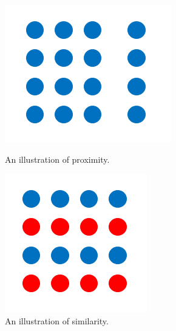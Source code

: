 			\begin{figure}
  					\includegraphics[width=\linewidth]{resources/images/proximity.png}
  					\caption{An illustration of proximity.}\label{fig:proximity}
  				\endminipage\hfill
  					\includegraphics[width=\linewidth]{resources/images/similarity.png}
  					\caption{An illustration of similarity.}\label{fig:similarity}

\end{figure}
